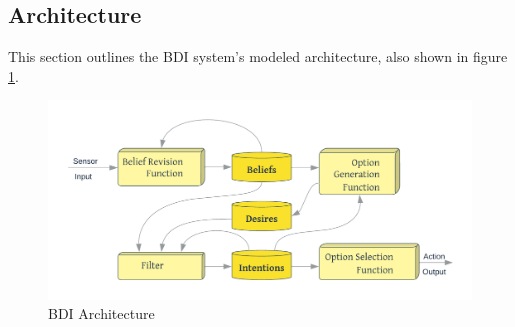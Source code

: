 \subsection{Architecture}

This section outlines the \ac{BDI} system's modeled architecture, also shown in figure \ref{BDI Architecture}.

    \begin{figure}[h]
    \centering
      \includegraphics[width=12cm]{includes/figures/BDI_arch.png}
      \caption{\ac{BDI} Architecture \cite{bdiarch}}
      \label{BDI Architecture}
    \end{figure}
    
